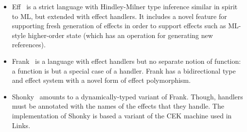 \documentclass[a4paper,twoside,10pt]{amsart}
\begin{document}
\begin{itemize}
\item Eff~\cite{BauerP15} is a strict language with Hindley-Milner
  type inference similar in spirit to ML, but extended with effect
  handlers.
%
  It includes a novel feature for supporting fresh generation of
  effects in order to support effects such as ML-style higher-order
  state (which has an operation for generating new references).

\item Frank~\cite{LindleyMM16} is a language with effect handlers but
  no separate notion of function: a function is but a special case of
  a handler. Frank has a bidirectional type and effect system with a
  novel form of effect polymorphism.
  

\item Shonky~\cite{McBride16} amounts to a dynamically-typed variant
  of Frank. Though, handlers must be annotated with the names of the
  effects that they handle. The implementation of Shonky is based a
  variant of the CEK machine used in Links.
\end{itemize}

\nocite{*}


\end{document}
